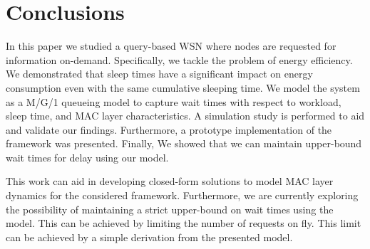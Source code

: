 \section{Conclusions}\label{sec:conclusions}
In this paper we studied a query-based WSN where nodes are requested for information on-demand. Specifically, we tackle the problem of energy efficiency. We demonstrated that sleep times have a significant impact on energy consumption even with the same cumulative sleeping time. We model the system as a M/G/1 queueing model to capture wait times with respect to workload, sleep time, and MAC layer characteristics. A simulation study is performed to aid and validate our findings. Furthermore, a prototype implementation of the framework was presented. Finally, We showed that we can maintain upper-bound wait times for delay using our model.

This work can aid in developing closed-form solutions to model MAC layer dynamics for the considered framework. Furthermore, we are currently exploring the possibility of maintaining a strict upper-bound on wait times using the model. This can be achieved by limiting the number of requests on fly. This limit can be achieved by a simple derivation from the presented model.

